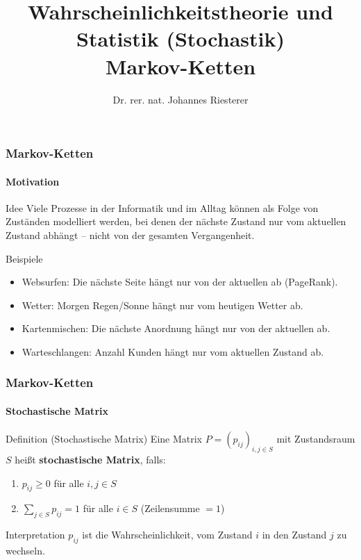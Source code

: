 \documentclass{beamer}
\begin{document}
\title[Stochastik] %
{Wahrscheinlichkeitstheorie und Statistik (Stochastik)
\\
Markov-Ketten
}
\subtitle{}
\author[Dr. Johannes Riesterer] %
{Dr.  rer. nat. Johannes Riesterer}

\date[KPT 2004] %
{}

\subject{Stochastik}

\frame{\titlepage}



\begin{frame}
    \frametitle{Markov-Ketten}
\framesubtitle{Motivation}
    \begin{block}{Idee}
Viele Prozesse in der Informatik und im Alltag können als Folge von Zuständen modelliert werden, bei denen der nächste Zustand nur vom aktuellen Zustand abhängt -- nicht von der gesamten Vergangenheit.
\end{block}
\begin{block}{Beispiele}
\begin{itemize}
\item Websurfen: Die nächste Seite hängt nur von der aktuellen ab (PageRank).
\item Wetter: Morgen Regen/Sonne hängt nur vom heutigen Wetter ab.
\item Kartenmischen: Die nächste Anordnung hängt nur von der aktuellen ab.
\item Warteschlangen: Anzahl Kunden hängt nur vom aktuellen Zustand ab.
\end{itemize}
\end{block}
 \end{frame}



\begin{frame}
    \frametitle{Markov-Ketten}
\framesubtitle{Stochastische Matrix}
    \begin{block}{Definition (Stochastische Matrix)}
Eine Matrix $P = (p_{ij})_{i,j \in S}$ mit Zustandsraum $S$ heißt \textbf{stochastische Matrix}, falls:
\begin{enumerate}
\item $p_{ij} \geq 0$ für alle $i, j \in S$
\item $\sum_{j \in S} p_{ij} = 1$ für alle $i \in S$ \quad (Zeilensumme $= 1$)
\end{enumerate}
\end{block}
\begin{block}{Interpretation}
$p_{ij}$ ist die Wahrscheinlichkeit, vom Zustand $i$ in den Zustand $j$ zu wechseln.
\end{block}
 \end{frame}
\end{document}
